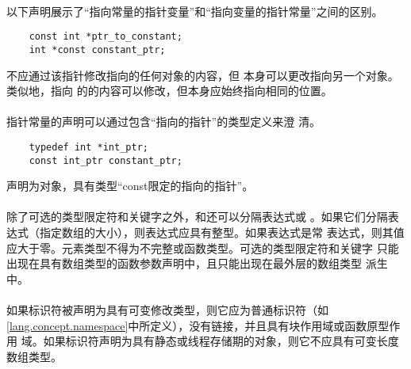 {\paragraph{}
\ex* 以下声明展示了``指向常量的指针变量''和``指向变量的指针常量''之间的区别。
\begin{lstlisting}
    const int *ptr_to_constant;
    int *const constant_ptr;
\end{lstlisting}
不应通过该指针修改指向的任何对象的内容，但
本身可以更改指向另一个对象。类似地，指向
的的内容可以修改，但本身应始终指向相同的位置。

\paragraph{}
指针常量的声明可以通过包含``指向的指针''的类型定义来澄
清。
\begin{lstlisting}
    typedef int *int_ptr;
    const int_ptr constant_ptr;
\end{lstlisting}
声明为对象，具有类型``const限定的指向的指针''。

\constraint
\paragraph{}
除了可选的类型限定符和关键字之外，\tm{[}和\tm{]}还可以分隔表达式或
\tm{*}。如果它们分隔表达式（指定数组的大小），则表达式应具有整型。如果表达式是常
表达式，则其值应大于零。元素类型不得为不完整或函数类型。可选的类型限定符和关键字
只能出现在具有数组类型的函数参数声明中，且只能出现在最外层的数组类型
派生中。

\paragraph{}
如果标识符被声明为具有可变修改类型，则它应为普通标识符（如
\ref{lang.concept.namespace}中所定义），没有链接，并且具有块作用域或函数原型作用
域。如果标识符声明为具有静态或线程存储期的对象，则它不应具有可变长度数组类型。

\semantic
}
